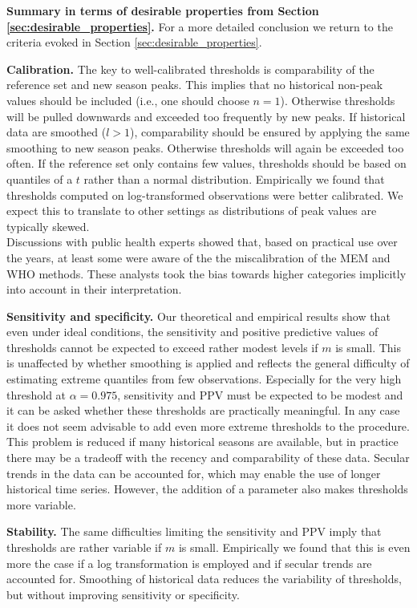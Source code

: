 \documentclass[12pt]{article}
\begin{document}
\noindent \textbf{Summary in terms of desirable properties from Section \ref{sec:desirable_properties}.} For a more detailed conclusion we return to the criteria evoked in Section \ref{sec:desirable_properties}.

\begin{description}
\item \textbf{Calibration.} The key to well-calibrated thresholds is comparability of the reference set and new season peaks. This implies that no historical non-peak values should be included (i.e., one should choose $n = 1$). Otherwise thresholds will be pulled downwards and exceeded too frequently by new peaks. If historical data are smoothed ($l > 1$), comparability should be ensured by applying the same smoothing to new season peaks. Otherwise thresholds will again be exceeded too often. If the reference set only contains few values, thresholds should be based on quantiles of a $t$ rather than a normal distribution. Empirically we found that thresholds computed on log-transformed observations were better calibrated. We expect this to translate to other settings as distributions of peak values are typically skewed.\\
Discussions with public health experts showed that, based on practical use over the years, at least some were aware of the the miscalibration of the MEM and WHO methods. These analysts took the bias towards higher categories implicitly into account in their interpretation.
\item \textbf{Sensitivity and specificity.} Our theoretical and empirical results show that even under ideal conditions, the sensitivity and positive predictive values of thresholds cannot be expected to exceed rather modest levels if $m$ is small. This is unaffected by whether smoothing is applied and reflects the general difficulty of estimating extreme quantiles from few observations. Especially for the very high threshold at $\alpha = 0.975$, sensitivity and PPV must be expected to be modest and it can be asked whether these thresholds are practically meaningful. In any case it does not seem advisable to add even more extreme thresholds to the procedure. This problem is reduced if many historical seasons are available, but in practice there may be a tradeoff with the recency and comparability of these data. Secular trends in the data can be accounted for, which may enable the use of longer historical time series. However, the addition of a parameter also makes thresholds more variable.
\item \textbf{Stability.} The same difficulties limiting the sensitivity and PPV imply that thresholds are rather variable if $m$ is small. Empirically we found that this is even more the case if a log transformation is employed and if secular trends are accounted for. Smoothing of historical data reduces the variability of thresholds, but without improving sensitivity or specificity.

\end{description}
\end{document}
